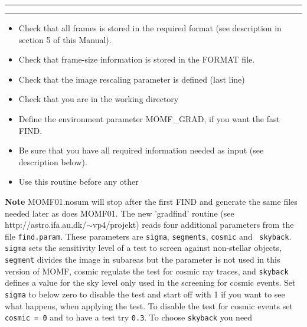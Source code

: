 \documentclass[]{article}
\begin{document}
\newpage
{}
\newline \rule{15.5cm}{0.3mm}
\vspace{0.1mm}
\newline \rule{15.5cm}{0.3mm}
\vspace{4mm}
\begin{itemize}
\item Check that all frames is stored in the required format (see
description in section 5 of this Manual).
\item Check that frame-size information is stored in the FORMAT file.
\item Check that the image rescaling parameter is defined (last line)
\item Check that you are in the working directory
\item Define the environment parameter MOMF\_GRAD, if you want the fast FIND.
\item Be sure that you have all required information needed as input
(see description below).
\item Use this routine before any other
\end{itemize}
\vspace{2mm}
{\bf Note}
\newline MOMF01.nosum will stop after the first FIND and generate the
same files needed later as does MOMF01. The new 'gradfind' routine 
(see http://astro.ifa.au.dk/$\sim$vp4/projekt) reads
four additional parameters from the file {\tt find.param}. These parameters
are {\tt sigma}, {\tt segments}, {\tt cosmic} and {\tt 
skyback}. {\tt sigma} sets the sensitivity level of a test to screen
against non-stellar objects, {\tt segment}
divides the image in subareas but the parameter is not used in this
version of MOMF, cosmic regulate the test for cosmic ray traces,
and {\tt skyback} defines a value for the sky level only used in the
screening for cosmic events. 
Set {\tt sigma} to below zero to disable the test and start off
with 1 if you want to see what happens, when applying the test.
To disable the test for cosmic events set {\tt cosmic = 0} and
to have a test try {\tt 0.3}. To choose {\tt skyback} you need
\end{document}
